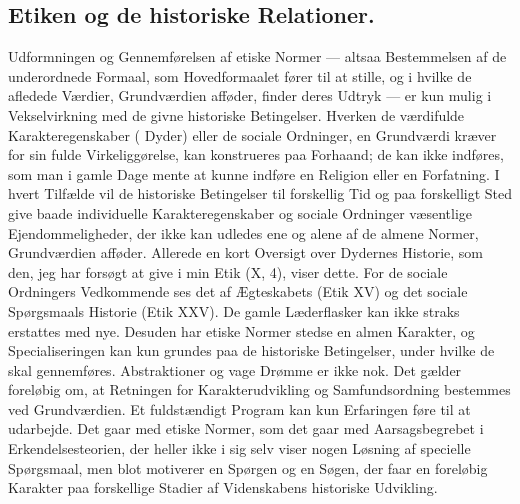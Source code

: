 \documentclass[12pt]{article}
\newcommand{\opage}[1]{\marginnote{\footnotesize\textit{[#1]}}}
\begin{document}
\subsection{Etiken og de historiske Relationer.}\label{sec:4c}
\noindent
Udformningen og Gennemførelsen af etiske Normer --- altsaa Bestemmelsen
af de underordnede Formaal, som Hovedformaalet fører til at stille, og i
hvilke de afledede Værdier, Grundværdien afføder, finder deres Udtryk
--- er kun mulig i Vekselvirkning med de givne historiske Betingelser.
Hverken de værdifulde Karakteregenskaber (\guillemotright
Dyder\guillemotleft) eller de sociale Ordninger, en Grundværdi kræver
for sin fulde Virkeliggørelse, kan konstrueres paa Forhaand; de kan ikke
\guillemotright indføres\guillemotleft, som man i gamle Dage mente at
kunne \guillemotright indføre\guillemotleft{} en Religion eller en
Forfatning. I hvert Tilfælde vil de historiske Betingelser til
forskellig Tid og paa forskelligt Sted give baade individuelle
Karakteregenskaber og sociale Ordninger væsentlige Ejendommeligheder,
der ikke kan udledes ene og alene af de almene Normer, Grundværdien
afføder. Allerede en kort Oversigt over Dydernes Historie, som den, jeg
har forsøgt at give i min Etik (X, 4), viser dette. For de sociale
Ordningers Vedkommende ses det af Ægteskabets (Etik XV) og det sociale
Spørgsmaals Historie (Etik XXV). De gamle Læderflasker kan ikke straks
erstattes med nye. Desuden har etiske Normer stedse en almen Karakter,
og Specialiseringen kan kun grundes paa de historiske Betingelser, under
hvilke de skal gennemføres.
\opage{88} \setcounter{footnote}{0}
Abstraktioner og vage Drømme er ikke nok. Det gælder foreløbig om, at
Retningen for Karakterudvikling og Samfundsordning bestemmes ved
Grundværdien. Et fuldstændigt Program kan kun Erfaringen føre til at
udarbejde. Det gaar med etiske Normer, som det gaar med Aarsagsbegrebet
i Erkendelsesteorien, der heller ikke i sig selv viser nogen Løsning af
specielle Spørgsmaal, men blot motiverer en Spørgen og en Søgen, der
faar en foreløbig Karakter paa forskellige Stadier af Videnskabens
historiske Udvikling.
\end{document}
